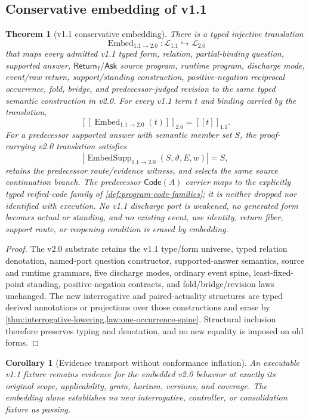 \documentclass[11pt,oneside]{article}
\newtheorem{theorem}[definition]{Theorem}
\newtheorem{corollary}[definition]{Corollary}
\newcommand{\den}[1]{[\![#1]\!]}
\begin{document}
\subsection{Conservative embedding of v1.1}

\begin{theorem}[v1.1 conservative embedding]\label{thm:v11-embedding}
There is a typed injective translation
\[
\boxed{
\operatorname{Embed}_{1.1\to2.0}:
\mathcal L_{1.1}\hookrightarrow\mathcal L_{2.0}
}
\]
that maps every admitted v1.1 typed form, relation, partial-binding question, supported answer,
\(\mathsf{Return}_I/\mathsf{Ask}\) source program, runtime program, discharge mode, event/raw
return, support/standing construction, positive-negation reciprocal occurrence, fold, bridge, and
predecessor-judged revision to the same typed semantic construction in v2.0.  For every v1.1 term
\(t\) and binding carried by the translation,
\[
\boxed{
\den{\operatorname{Embed}_{1.1\to2.0}(t)}_{2.0}
=
\den{t}_{1.1}.
}
\]
For a predecessor supported answer with semantic member set \(S\), the proof-carrying v2.0
translation satisfies
\[
\boxed{
\left|\operatorname{EmbedSupp}_{1.1\to2.0}(S,\vartheta,E,w)\right|=S,
}
\]
retains the predecessor route/evidence witness, and selects the same source continuation branch.
The predecessor \(\mathsf{Code}(A)\) carrier maps to the explicitly typed reified-code family of
\cref{def:program-code-families}; it is neither dropped nor identified with execution.
No v1.1 discharge port is weakened, no generated form becomes actual or standing, and no existing
event, use identity, return fiber, support route, or reopening condition is erased by embedding.
\end{theorem}

\begin{proof}
The v2.0 substrate retains the v1.1 type/form universe, typed relation denotation, named-port
question constructor, supported-answer semantics, source and runtime grammars, five discharge
modes, ordinary event spine, least-fixed-point standing, positive-negation contracts, and
fold/bridge/revision laws unchanged.  The new interrogative and paired-actuality structures are
typed derived annotations or projections over those constructions and erase by
\cref{thm:interrogative-lowering,law:one-occurrence-spine}.  Structural inclusion therefore
preserves typing and denotation, and no new equality is imposed on old forms.
\end{proof}

\begin{corollary}[Evidence transport without conformance inflation]\label{cor:v11-evidence-transport}
An executable v1.1 fixture remains evidence for the embedded v2.0 behavior at exactly its original
scope, applicability, grain, horizon, versions, and coverage.  The embedding alone establishes no
new interrogative, controller, or consolidation fixture as passing.
\end{corollary}
\end{document}
